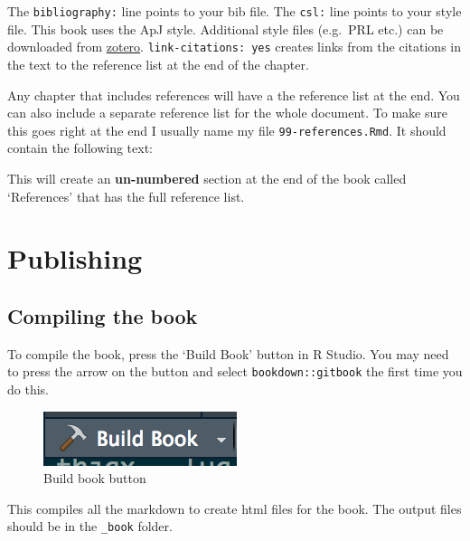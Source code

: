 \documentclass[]{book}
\newenvironment{Shaded}{\begin{snugshade}}{\end{snugshade}}
\begin{document}
The \texttt{bibliography:} line points to your bib file. The \texttt{csl:} line points to your style file. This book uses the ApJ style. Additional style files (e.g.~PRL etc.) can be downloaded from \href{https://www.zotero.org/styles}{zotero}. \texttt{link-citations:\ yes} creates links from the citations in the text to the reference list at the end of the chapter.

Any chapter that includes references will have a the reference list at the end. You can also include a separate reference list for the whole document. To make sure this goes right at the end I usually name my file \texttt{99-references.Rmd}. It should contain the following text:

\begin{Shaded}
\begin{Highlighting}[]

\end{Highlighting}
\end{Shaded}

This will create an \textbf{un-numbered} section at the end of the book called `References' that has the full reference list.

\hypertarget{sec:publishing}{%
\chapter{Publishing}\label{sec:publishing}}

\hypertarget{sec:create-book}{%
\section{Compiling the book}\label{sec:create-book}}

To compile the book, press the `Build Book' button in R Studio. You may need to press the arrow on the button and select \texttt{bookdown::gitbook} the first time you do this.

\begin{figure}
\includegraphics[width=0.5\linewidth]{Images/build-book} \caption{Build book button}\label{fig:build-book}
\end{figure}

This compiles all the markdown to create html files for the book. The output files should be in the \texttt{\_book} folder.
\end{document}
